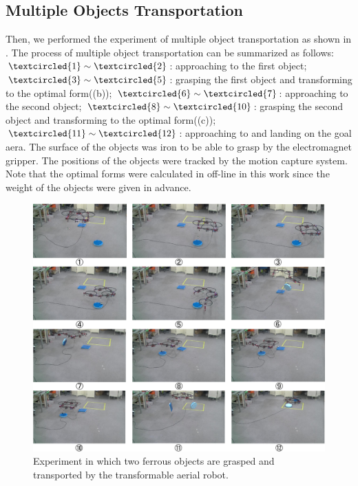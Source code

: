 \subsection{Multiple Objects Transportation}
Then, we performed the experiment of multiple object transportation as shown in . The process of multiple object transportation can be summarized as follows:$\textcircled{\scriptsize 1}\sim \textcircled{\scriptsize 2}$: approaching to the first object; $\textcircled{\scriptsize 3}\sim \textcircled{\scriptsize 5}$: grasping the first object and transforming to the optimal form((b)); $\textcircled{\scriptsize 6}\sim \textcircled{\scriptsize 7}$: approaching to the second object; $\textcircled{\scriptsize 8}\sim \textcircled{\scriptsize 10}$: grasping the second object and transforming to the optimal form((c)); $\textcircled{\scriptsize 11}\sim \textcircled{\scriptsize 12}$: approaching to and landing on the goal aera. The surface of the objects was iron to be able to grasp by the electromagnet gripper. The positions of the objects were tracked by the motion capture system. Note that the optimal forms were calculated in off-line in this work since the weight of the objects were given in advance.
\begin{figure}[t]
  \begin{center}
    \includegraphics[width=1.0\columnwidth]{figs/experiment.pdf}
  \end{center}
  \caption{Experiment in which two ferrous objects are grasped and transported by the transformable aerial robot.\label{figure:experiment}}
\end{figure}

